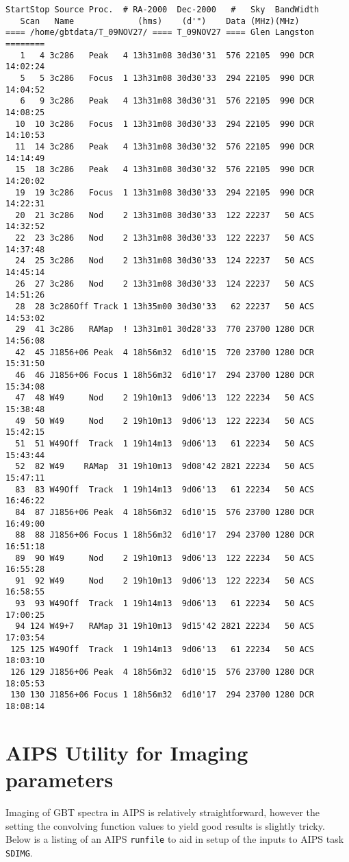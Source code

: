 \documentclass[12pt,twoside]{article}
\begin{document}
\begin{verbatim}
StartStop Source Proc.  # RA-2000  Dec-2000   #   Sky  BandWidth
   Scan   Name             (hms)    (d'")    Data (MHz)(MHz)
==== /home/gbtdata/T_09NOV27/ ==== T_09NOV27 ==== Glen Langston ========
   1   4 3c286   Peak   4 13h31m08 30d30'31  576 22105  990 DCR 14:02:24
   5   5 3c286   Focus  1 13h31m08 30d30'33  294 22105  990 DCR 14:04:52
   6   9 3c286   Peak   4 13h31m08 30d30'31  576 22105  990 DCR 14:08:25
  10  10 3c286   Focus  1 13h31m08 30d30'33  294 22105  990 DCR 14:10:53
  11  14 3c286   Peak   4 13h31m08 30d30'32  576 22105  990 DCR 14:14:49
  15  18 3c286   Peak   4 13h31m08 30d30'32  576 22105  990 DCR 14:20:02
  19  19 3c286   Focus  1 13h31m08 30d30'33  294 22105  990 DCR 14:22:31
  20  21 3c286   Nod    2 13h31m08 30d30'33  122 22237   50 ACS 14:32:52
  22  23 3c286   Nod    2 13h31m08 30d30'33  122 22237   50 ACS 14:37:48
  24  25 3c286   Nod    2 13h31m08 30d30'33  124 22237   50 ACS 14:45:14
  26  27 3c286   Nod    2 13h31m08 30d30'33  124 22237   50 ACS 14:51:26
  28  28 3c286Off Track 1 13h35m00 30d30'33   62 22237   50 ACS 14:53:02
  29  41 3c286   RAMap  ! 13h31m01 30d28'33  770 23700 1280 DCR 14:56:08
  42  45 J1856+06 Peak  4 18h56m32  6d10'15  720 23700 1280 DCR 15:31:50
  46  46 J1856+06 Focus 1 18h56m32  6d10'17  294 23700 1280 DCR 15:34:08
  47  48 W49     Nod    2 19h10m13  9d06'13  122 22234   50 ACS 15:38:48
  49  50 W49     Nod    2 19h10m13  9d06'13  122 22234   50 ACS 15:42:15
  51  51 W49Off  Track  1 19h14m13  9d06'13   61 22234   50 ACS 15:43:44
  52  82 W49    RAMap  31 19h10m13  9d08'42 2821 22234   50 ACS 15:47:11
  83  83 W49Off  Track  1 19h14m13  9d06'13   61 22234   50 ACS 16:46:22
  84  87 J1856+06 Peak  4 18h56m32  6d10'15  576 23700 1280 DCR 16:49:00
  88  88 J1856+06 Focus 1 18h56m32  6d10'17  294 23700 1280 DCR 16:51:18
  89  90 W49     Nod    2 19h10m13  9d06'13  122 22234   50 ACS 16:55:28
  91  92 W49     Nod    2 19h10m13  9d06'13  122 22234   50 ACS 16:58:55
  93  93 W49Off  Track  1 19h14m13  9d06'13   61 22234   50 ACS 17:00:25
  94 124 W49+7   RAMap 31 19h10m13  9d15'42 2821 22234   50 ACS 17:03:54
 125 125 W49Off  Track  1 19h14m13  9d06'13   61 22234   50 ACS 18:03:10
 126 129 J1856+06 Peak  4 18h56m32  6d10'15  576 23700 1280 DCR 18:05:53
 130 130 J1856+06 Focus 1 18h56m32  6d10'17  294 23700 1280 DCR 18:08:14
\end{verbatim}

\section{AIPS Utility for Imaging parameters}
Imaging of GBT spectra in AIPS is relatively straightforward, however
the setting the convolving function values to yield good results is
slightly tricky.   Below is a listing of an AIPS {\tt runfile} to
aid in setup of the inputs to AIPS task {\tt SDIMG}.
\end{document}

